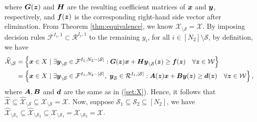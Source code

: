 \documentclass[fleqn,orsc,blindrev]{informs4}
\newcommand{\mb}[1]{\mbox{\boldmath \ensuremath{#1}}}
\begin{document}
	where $\mb{G}(\mb{z})$ and $\mb{H}$ are the resulting coefficient matrices of $\mb{x}$ and $\mb{y}$, respectively, and $\mb{f}(\mb{z})$ is the corresponding right-hand side vector after elimination. From Theorem \ref{thm:equivalence}, we know $\mathcal{X}_{\setminus \mathcal{S}} = \mathcal{X}$. By imposing decision rules  $\mathcal{F}^{I_1,1}\subset \mathcal{R}^{I_1,1}$ to the remaining $y_i$, for all $i \in [N_2]\setminus \mathcal{S}$, by definition, we have
\begin{align*}
		\widehat{\mathcal{X}}_{\setminus \mathcal{S}} & = \left\{ \mb{x}\in X \hspace{3pt} | \hspace{3pt}  \exists  \mb{y}_{\setminus \mathcal{S}} \in \mathcal{F}^{I_1,N_2-|\mathcal{S}|}: \mb{G}(\mb{z})\mb{x}+\mb{H}\mb{y}_{\setminus \mathcal{S}}(\mb{z}) \geq \mb{f}(\mb{z}) \quad \forall \mb{z} \in \mathcal{W}\right\}\\
		& = \left\{ \mb{x} \in X \hspace{3pt} | \hspace{3pt}  \exists   \mb{y}_{\setminus \mathcal{S}} \in \mathcal{F}^{I_1,N_2-|\mathcal{S}|}, \hspace{3pt} \mb{y}_{\mathcal{S}} \in \mathcal{R}^{I_1,|\mathcal{S}|}: \mb{A}(\mb{z})\mb{x}+\mb{B}\mb{y}(\mb{z}) \geq \mb{d}(\mb{z}) \quad  \forall \mb{z} \in \mathcal{W} \right\}, 
\end{align*}
	where $\mb{A}, \mb{B}$ and $\mb{d}$ are the same as in (\ref{set:X}). Hence, it follows that $\widehat{\mathcal{X}} \subseteq  \widehat{\mathcal{X}}_{\setminus \mathcal{S}} \subseteq \mathcal{X}_{\setminus \mathcal{S}} = \mathcal{X}$. Now, suppose $\mathcal{S}_1 \subseteq \mathcal{S}_2 \subseteq [N_2]$, we have  $\widehat{\mathcal{X}}_{\setminus \mathcal{S}_1}  \subseteq  \widehat{\mathcal{X}}_{\setminus \mathcal{S}_2} \subseteq \mathcal{X}_{\setminus \mathcal{S}_1}= \mathcal{X}_{\setminus \mathcal{S}_2}  = \mathcal{X}$.  \hfill \Halmos \\
	
\end{document}
